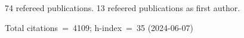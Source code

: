 74 refereed publications. 13 refeered publications as first author.

Total citations~=~4109; h-index~=~35 (2024-06-07)